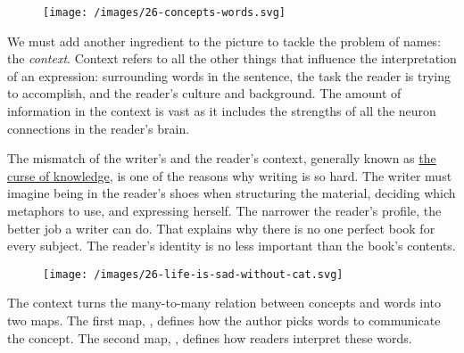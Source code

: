 \documentclass{article}
\begin{document}
\begin{figure}[grayscale-diagram,medium-size]
  \texttt{[image: /images/26-concepts-words.svg]}
\end{figure}

We must add another ingredient to the picture to tackle the problem of names: the \emph{context}.
Context refers to all the other things that influence the interpretation of an expression:
surrounding words in the sentence,
the task the reader is trying to accomplish,
and the reader's culture and background.
The amount of information in the context is vast as it includes the strengths of all the neuron connections in the reader's brain.

The mismatch of the writer's and the reader's context,
generally known as \href{https://en.wikipedia.org/wiki/Curse_of_knowledge}{the curse of knowledge},
is one of the reasons why writing is so hard.
The writer must imagine being in the reader's shoes when structuring the material,
deciding which metaphors to use, and expressing herself.
The narrower the reader's profile, the better job a writer can do.
That explains why there is no one perfect book for every subject.
The reader's identity is no less important than the book's contents.

\begin{figure}[grayscale-diagram,medium-size]
  \texttt{[image: /images/26-life-is-sad-without-cat.svg]}
\end{figure}

The context turns the many-to-many relation between concepts and words into two maps.
The first map,
,
defines how the author picks words to communicate the concept.
The second map,
,
defines how readers interpret these words.
\end{document}
